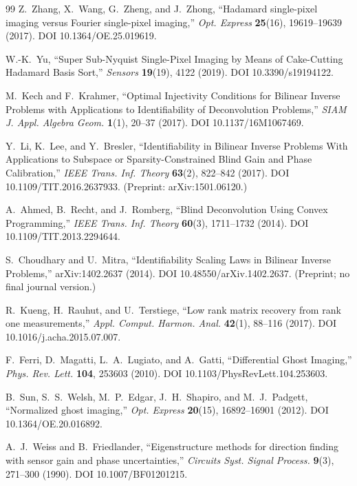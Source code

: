\begin{thebibliography}{99}
Z.~Zhang, X.~Wang, G.~Zheng, and J.~Zhong, ``Hadamard single-pixel imaging versus Fourier single-pixel imaging,'' \emph{Opt. Express} \textbf{25}(16), 19619--19639 (2017). DOI 10.1364/OE.25.019619.

W.-K.~Yu, ``Super Sub-Nyquist Single-Pixel Imaging by Means of Cake-Cutting Hadamard Basis Sort,'' \emph{Sensors} \textbf{19}(19), 4122 (2019). DOI 10.3390/s19194122.

M.~Kech and F.~Krahmer, ``Optimal Injectivity Conditions for Bilinear Inverse Problems with Applications to Identifiability of Deconvolution Problems,'' \emph{SIAM J. Appl. Algebra Geom.} \textbf{1}(1), 20--37 (2017). DOI 10.1137/16M1067469.

Y.~Li, K.~Lee, and Y.~Bresler, ``Identifiability in Bilinear Inverse Problems With Applications to Subspace or Sparsity-Constrained Blind Gain and Phase Calibration,'' \emph{IEEE Trans. Inf. Theory} \textbf{63}(2), 822--842 (2017). DOI 10.1109/TIT.2016.2637933. (Preprint: arXiv:1501.06120.)

A.~Ahmed, B.~Recht, and J.~Romberg, ``Blind Deconvolution Using Convex Programming,'' \emph{IEEE Trans. Inf. Theory} \textbf{60}(3), 1711--1732 (2014). DOI 10.1109/TIT.2013.2294644.

S.~Choudhary and U.~Mitra, ``Identifiability Scaling Laws in Bilinear Inverse Problems,'' arXiv:1402.2637 (2014). DOI 10.48550/arXiv.1402.2637. (Preprint; no final journal version.)

R.~Kueng, H.~Rauhut, and U.~Terstiege, ``Low rank matrix recovery from rank one measurements,'' \emph{Appl. Comput. Harmon. Anal.} \textbf{42}(1), 88--116 (2017). DOI 10.1016/j.acha.2015.07.007.

F.~Ferri, D.~Magatti, L.~A.~Lugiato, and A.~Gatti, ``Differential Ghost Imaging,'' \emph{Phys. Rev. Lett.} \textbf{104}, 253603 (2010). DOI 10.1103/PhysRevLett.104.253603.

B.~Sun, S.~S.~Welsh, M.~P.~Edgar, J.~H.~Shapiro, and M.~J.~Padgett, ``Normalized ghost imaging,'' \emph{Opt. Express} \textbf{20}(15), 16892--16901 (2012). DOI 10.1364/OE.20.016892.

A.~J.~Weiss and B.~Friedlander, ``Eigenstructure methods for direction finding with sensor gain and phase uncertainties,'' \emph{Circuits Syst. Signal Process.} \textbf{9}(3), 271--300 (1990). DOI 10.1007/BF01201215.


\end{thebibliography}
